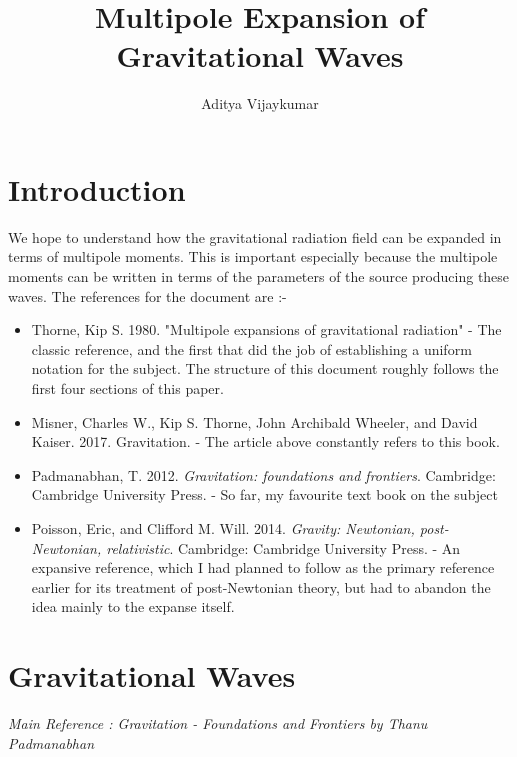 \documentclass[a4paper,11pt]{article}
\title{\textbf{Multipole Expansion of Gravitational Waves}}
\author{Aditya Vijaykumar}
\affiliation{International Centre for Theoretical Sciences, Bengaluru, India.}
\begin{document}
\maketitle

\section{Introduction}
We hope to understand how the gravitational radiation field can be expanded in terms of multipole moments. This is important especially because the multipole moments can be written in terms of the parameters of the source producing these waves. The references for the document are :-
\begin{itemize}
	\item Thorne, Kip S. 1980. "Multipole expansions of gravitational radiation" - The classic reference, and the first that did the job of establishing a uniform notation for the subject. The structure of this document roughly follows the first four sections of this paper.	
	\item Misner, Charles W., Kip S. Thorne, John Archibald Wheeler, and David Kaiser. 2017. Gravitation. - The article above constantly refers to this book.
	\item Padmanabhan, T. 2012. \textit{Gravitation: foundations and frontiers}. Cambridge: Cambridge University Press. - So far, my favourite text book on the subject
	\item Poisson, Eric, and Clifford M. Will. 2014. \textit{Gravity: Newtonian, post-Newtonian, relativistic}. Cambridge: Cambridge University Press. - An expansive reference, which I had planned to follow  as the primary reference earlier for its treatment of post-Newtonian theory, but had to abandon the idea mainly to the expanse itself.
\end{itemize}

\section{Gravitational Waves}
\textit{Main Reference : Gravitation - Foundations and Frontiers by Thanu Padmanabhan}
\end{document}
